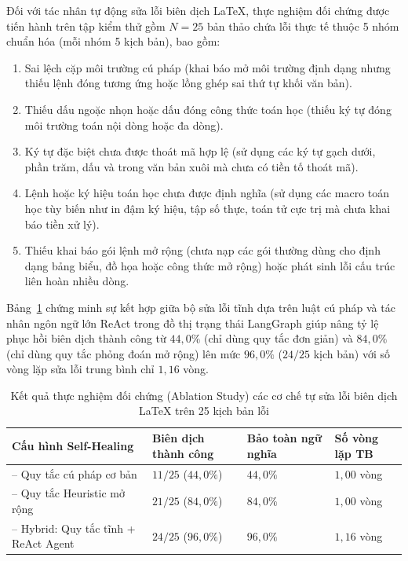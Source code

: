 Đối với tác nhân tự động sửa lỗi biên dịch LaTeX, thực nghiệm đối chứng được tiến hành trên tập kiểm thử gồm $N = 25$ bản thảo chứa lỗi thực tế thuộc 5 nhóm chuẩn hóa (mỗi nhóm 5 kịch bản), bao gồm:
\begin{enumerate}[noitemsep, topsep=2pt]
    \item Sai lệch cặp môi trường cú pháp (khai báo mở môi trường định dạng nhưng thiếu lệnh đóng tương ứng hoặc lồng ghép sai thứ tự khối văn bản).
    \item Thiếu dấu ngoặc nhọn hoặc dấu đóng công thức toán học (thiếu ký tự đóng môi trường toán nội dòng hoặc đa dòng).
    \item Ký tự đặc biệt chưa được thoát mã hợp lệ (sử dụng các ký tự gạch dưới, phần trăm, dấu và trong văn bản xuôi mà chưa có tiền tố thoát mã).
    \item Lệnh hoặc ký hiệu toán học chưa được định nghĩa (sử dụng các macro toán học tùy biến như in đậm ký hiệu, tập số thực, toán tử cực trị mà chưa khai báo tiền xử lý).
    \item Thiếu khai báo gói lệnh mở rộng (chưa nạp các gói thường dùng cho định dạng bảng biểu, đồ họa hoặc công thức mở rộng) hoặc phát sinh lỗi cấu trúc liên hoàn nhiều dòng.
\end{enumerate}
Bảng~\ref{tab:ablation_latex_healing} chứng minh sự kết hợp giữa bộ sửa lỗi tĩnh dựa trên luật cú pháp và tác nhân ngôn ngữ lớn ReAct trong đồ thị trạng thái LangGraph giúp nâng tỷ lệ phục hồi biên dịch thành công từ $44{,}0\%$ (chỉ dùng quy tắc đơn giản) và $84{,}0\%$ (chỉ dùng quy tắc phỏng đoán mở rộng) lên mức $96{,}0\%$ ($24/25$ kịch bản) với số vòng lặp sửa lỗi trung bình chỉ $1{,}16$ vòng.

\begin{table}[!htbp]
\centering
\setlength{\tabcolsep}{6pt}
\renewcommand{\arraystretch}{1.20}
\caption{Kết quả thực nghiệm đối chứng (Ablation Study) các cơ chế tự sửa lỗi biên dịch LaTeX trên 25 kịch bản lỗi}
\label{tab:ablation_latex_healing}
\begin{tabularx}{\textwidth}{|>{\raggedright\arraybackslash}X|>{\centering\arraybackslash}m{2.6cm}|>{\centering\arraybackslash}m{2.5cm}|>{\centering\arraybackslash}m{2.3cm}|}
\hline
\centering\textbf{Cấu hình Self-Healing} & \textbf{Biên dịch thành công} & \textbf{Bảo toàn ngữ nghĩa} & \textbf{Số vòng lặp TB} \tabularnewline \hline
-- Quy tắc cú pháp cơ bản & $11/25$ ($44{,}0\%$) & $44{,}0\%$ & $1{,}00$ vòng \\ \hline
-- Quy tắc Heuristic mở rộng & $21/25$ ($84{,}0\%$) & $84{,}0\%$ & $1{,}00$ vòng \\ \hline
-- Hybrid: Quy tắc tĩnh + ReAct Agent & $24/25$ ($96{,}0\%$) & $96{,}0\%$ & $1{,}16$ vòng \\ \hline
\end{tabularx}
\end{table}

